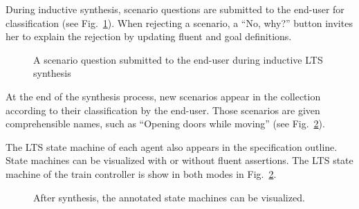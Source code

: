 During inductive synthesis, scenario questions are submitted to the end-user for classification (see Fig.~\ref{image:isis-tool-scenario-question}). When rejecting a scenario, a ``No, why?'' button invites her to explain the rejection by updating fluent and goal definitions. 

\begin{figure}
\centering{}
  \caption{A scenario question submitted to the end-user during inductive LTS synthesis\label{image:isis-tool-scenario-question}}
\end{figure}

At the end of the synthesis process, new scenarios appear in the collection according to their classification by the end-user. Those scenarios are given comprehensible names, such as ``Opening doors while moving'' (see Fig.~\ref{image:isis-after}). 

The LTS state machine of each agent also appears in the specification outline. State machines can be visualized with or without fluent assertions. The LTS state machine of the train controller is show in both modes in Fig.~\ref{image:isis-after}. 

\begin{figure}
\centering{}
  \caption{After synthesis, the annotated state machines can be visualized.\label{image:isis-after}}
\end{figure}

